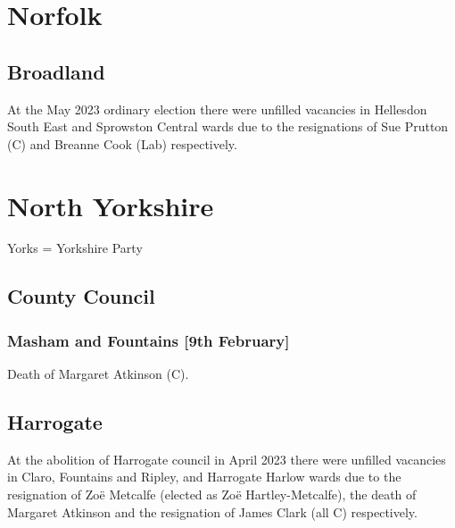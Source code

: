 \documentclass[a4paper,openany]{book}
\begin{document}
\begin{resultsiii}
\section{Norfolk}

\subsection*{Broadland}

At the May 2023 ordinary election there were unfilled vacancies in Hellesdon South East and Sprowston Central wards due to the resignations of Sue Prutton (C) and Breanne Cook (Lab) respectively.%
%

\section{North Yorkshire}

Yorks = Yorkshire Party

\subsection*{County Council}

\subsubsection*{Masham and Fountains \hspace*{\fill}\nolinebreak[1]%
	\enspace\hspace*{\fill}
	[9th February]}


Death of Margaret Atkinson (C).

\subsection*{Harrogate}

At the abolition of Harrogate council in April 2023 there were unfilled vacancies in Claro, Fountains and Ripley, and Harrogate Harlow wards due to the resignation of Zoë Metcalfe (elected as Zoë Hartley-Metcalfe), the death of Margaret Atkinson and the resignation of James Clark (all C) respectively.%
%
%


\end{resultsiii}
\end{document}
